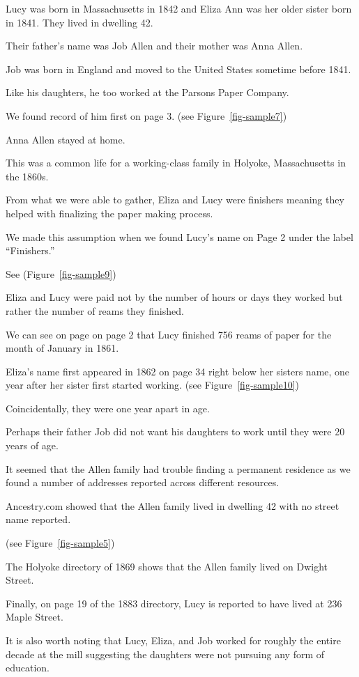 \documentclass[
  letterpaper,
  DIV=11,
  numbers=noendperiod]{scrartcl}
\begin{document}
Lucy was born in Massachusetts in 1842 and Eliza Ann was her older
sister born in 1841. They lived in dwelling 42.

Their father's name was Job Allen and their mother was Anna Allen.

Job was born in England and moved to the United States sometime before
1841.

Like his daughters, he too worked at the Parsons Paper Company.

We found record of him first on page 3. (see Figure~\ref{fig-sample7})

Anna Allen stayed at home.

This was a common life for a working-class family in Holyoke,
Massachusetts in the 1860s.

From what we were able to gather, Eliza and Lucy were finishers meaning
they helped with finalizing the paper making process.

We made this assumption when we found Lucy's name on Page 2 under the
label ``Finishers.''

See (Figure~\ref{fig-sample9})

Eliza and Lucy were paid not by the number of hours or days they worked
but rather the number of reams they finished.

We can see on page on page 2 that Lucy finished 756 reams of paper for
the month of January in 1861.

Eliza's name first appeared in 1862 on page 34 right below her sisters
name, one year after her sister first started working. (see
Figure~\ref{fig-sample10})

Coincidentally, they were one year apart in age.

Perhaps their father Job did not want his daughters to work until they
were 20 years of age.

It seemed that the Allen family had trouble finding a permanent
residence as we found a number of addresses reported across different
resources.

Ancestry.com showed that the Allen family lived in dwelling 42 with no
street name reported.

(see Figure~\ref{fig-sample5})

The Holyoke directory of 1869 shows that the Allen family lived on
Dwight Street.

Finally, on page 19 of the 1883 directory, Lucy is reported to have
lived at 236 Maple Street.

It is also worth noting that Lucy, Eliza, and Job worked for roughly the
entire decade at the mill suggesting the daughters were not pursuing any
form of education.
\end{document}
